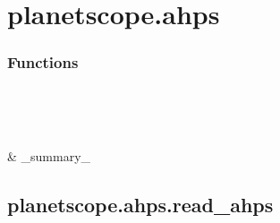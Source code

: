 \documentclass[letterpaper,10pt,english]{sphinxmanual}
\begin{document}
\section{planetscope.ahps}
\label{\detokenize{_autosummary/planetscope.ahps:module-planetscope.ahps}}\label{\detokenize{_autosummary/planetscope.ahps:planetscope-ahps}}\label{\detokenize{_autosummary/planetscope.ahps::doc}}\subsubsection*{Functions}


\begin{savenotes}\sphinxatlongtablestart\begin{longtable}[c]{}
\hline

\endfirsthead

%
{}\\
\hline

\endhead

\hline
{}\\
\endfoot

\endlastfoot

\sphinxAtStartPar
{\hyperref[\detokenize{_autosummary/planetscope.ahps.read_ahps:planetscope.ahps.read_ahps}]{}}
&
\sphinxAtStartPar
\_summary\_
\\
\hline
\end{longtable}\sphinxatlongtableend\end{savenotes}


\subsection{planetscope.ahps.read\_ahps}
\label{\detokenize{_autosummary/planetscope.ahps.read_ahps:planetscope-ahps-read-ahps}}\label{\detokenize{_autosummary/planetscope.ahps.read_ahps::doc}}
\end{document}
